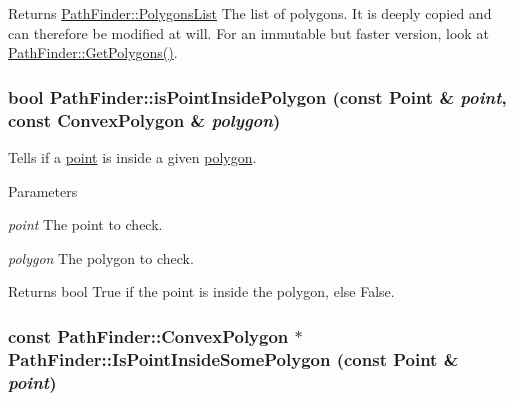 \begin{DoxyReturn}{Returns}
\hyperlink{classPathFinder_a16ed073fa542c82fd09e582cb4fbed24}{PathFinder::PolygonsList} The list of polygons. It is deeply copied and can therefore be modified at will. For an immutable but faster version, look at \hyperlink{classPathFinder_a61256a9d84ff19f3471f0b22f69527e2}{PathFinder::GetPolygons()}. 
\end{DoxyReturn}
\hypertarget{classPathFinder_a06935489b090eb301d58a27a461c556f}{
\subsubsection[{isPointInsidePolygon}]{\setlength{\rightskip}{0pt plus 5cm}bool PathFinder::isPointInsidePolygon (const {\bf Point} \& {\em point}, \/  const {\bf ConvexPolygon} \& {\em polygon})}}
\label{classPathFinder_a06935489b090eb301d58a27a461c556f}


Tells if a \hyperlink{structPathFinder_1_1Point}{point} is inside a given \hyperlink{structPathFinder_1_1ConvexPolygon}{polygon}. 


\begin{DoxyParams}{Parameters}
\item[{\em point}]The point to check. \item[{\em polygon}]The polygon to check. \end{DoxyParams}
\begin{DoxyReturn}{Returns}
bool True if the point is inside the polygon, else False. 
\end{DoxyReturn}
\hypertarget{classPathFinder_a465f6557bd6f5462dc0c363426f43322}{
\subsubsection[{IsPointInsideSomePolygon}]{\setlength{\rightskip}{0pt plus 5cm}const {\bf PathFinder::ConvexPolygon} $\ast$ PathFinder::IsPointInsideSomePolygon (const {\bf Point} \& {\em point})}}
\label{classPathFinder_a465f6557bd6f5462dc0c363426f43322}


